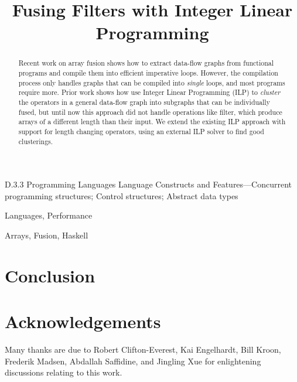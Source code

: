 \documentclass[preprint]{sigplanconf}
\begin{document}
\title{Fusing Filters with Integer Linear Programming}


\maketitle
\makeatactive

\begin{abstract}
Recent work on array fusion shows how to extract data-flow graphs from functional programs and compile them into efficient imperative loops. However, the compilation process only handles graphs that can be compiled into \emph{single} loops, and most programs require more. Prior work shows how use Integer Linear Programming (ILP) to \emph{cluster} the operators in a general data-flow graph into subgraphs that can be individually fused, but until now this approach did not handle operations like filter, which produce arrays of a different length than their input. We extend the existing ILP approach with support for length changing operators, using an external ILP solver to find good clusterings.
\end{abstract}


\category
	{D.3.3}
	{Programming Languages}
	{Language Constructs and Features---Concurrent programming structures; Control structures; Abstract data types}

\terms
	Languages, Performance

\keywords
	Arrays, Fusion, Haskell







\section{Conclusion}

\section*{Acknowledgements}
Many thanks are due to
Robert Clifton-Everest,
Kai Engelhardt,
Bill Kroon,
Frederik Madsen,
Abdallah Saffidine,
and Jingling Xue
for enlightening discussions relating to this work.



\end{document}
